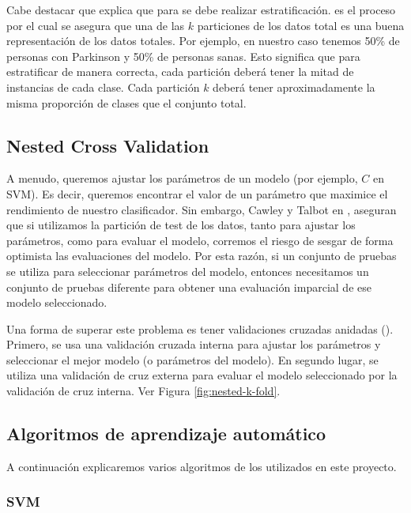Cabe destacar que \cite{CrossVal} explica que para  se debe realizar estratificación.  es el proceso por el cual se asegura que una de las $k$ particiones de los datos total es una buena representación de los datos totales. Por ejemplo, en nuestro caso tenemos 50\% de personas con Parkinson y 50\% de personas sanas. Esto significa que para estratificar de manera correcta, cada partición deberá tener la mitad de instancias de cada clase. Cada partición $k$ deberá tener aproximadamente la misma proporción de clases que el conjunto total.

\subsection{Nested Cross Validation}
A menudo, queremos ajustar los parámetros de un modelo (por ejemplo, $C$ en SVM). Es decir, queremos encontrar el valor de un parámetro que maximice el rendimiento de nuestro clasificador. Sin embargo, Cawley y Talbot en \cite{cawley2010over}, aseguran que si utilizamos la partición de test de los datos, tanto para ajustar los parámetros, como para evaluar el modelo, corremos el riesgo de sesgar de forma optimista las evaluaciones del modelo. Por esta razón, si un conjunto de pruebas se utiliza para seleccionar parámetros del modelo, entonces necesitamos un conjunto de pruebas diferente para obtener una evaluación imparcial de ese modelo seleccionado.


Una forma de superar este problema es tener validaciones cruzadas anidadas (). Primero, se usa una validación cruzada interna para ajustar los parámetros y seleccionar el mejor modelo (o parámetros del modelo). En segundo lugar, se utiliza una validación de cruz externa para evaluar el modelo seleccionado por la validación de cruz interna. Ver Figura \ref{fig:nested-k-fold}.




\subsection{Algoritmos de aprendizaje automático}

A continuación explicaremos varios algoritmos de los utilizados en este proyecto.

\subsubsection{SVM \cite{svmexpl}}

